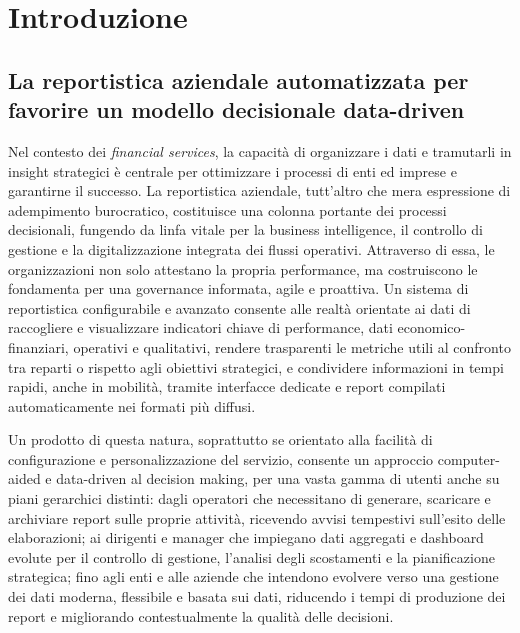 \chapter{Introduzione}
\section{La reportistica aziendale automatizzata per favorire un modello decisionale data-driven}
Nel contesto dei \emph{financial services}, la capacità di organizzare i dati e tramutarli in insight strategici è centrale per ottimizzare i processi di enti ed imprese e garantirne il successo.
La reportistica aziendale, tutt'altro che mera espressione di adempimento burocratico, costituisce una colonna portante dei processi decisionali, fungendo da linfa vitale per la business intelligence, il controllo di gestione e la digitalizzazione integrata dei flussi operativi.
Attraverso di essa, le organizzazioni non solo attestano la propria performance, ma costruiscono le fondamenta per una governance informata, agile e proattiva.
Un sistema di reportistica configurabile e avanzato consente alle realtà orientate ai dati di raccogliere e visualizzare indicatori chiave di performance, dati economico-finanziari, operativi e qualitativi, rendere trasparenti le metriche utili al confronto tra reparti o rispetto agli obiettivi strategici, e condividere informazioni in tempi rapidi, anche in mobilità, tramite interfacce dedicate e report compilati automaticamente nei formati più diffusi.

Un prodotto di questa natura, soprattutto se orientato alla facilità di configurazione e  personalizzazione del servizio\footnotemark, consente un approccio computer-aided e data-driven al decision making, per una vasta gamma di utenti anche su piani gerarchici distinti: dagli operatori che necessitano di generare, scaricare e archiviare report sulle proprie attività, ricevendo avvisi tempestivi sull’esito delle elaborazioni; ai dirigenti e manager che impiegano dati aggregati e dashboard evolute per il controllo di gestione, l’analisi degli scostamenti e la pianificazione strategica; fino agli enti e alle aziende che intendono evolvere verso una gestione dei dati moderna, flessibile e basata sui dati, riducendo i tempi di produzione dei report e migliorando contestualmente la qualità delle decisioni.



